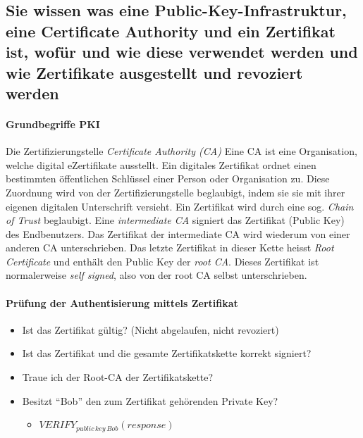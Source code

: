 \documentclass[10pt,a4paper]{article}
\begin{document}
\subsection*{Sie wissen was eine Public-Key-Infrastruktur, eine Certificate Authority und ein Zertifikat ist, wofür und wie diese verwendet werden und wie Zertifikate ausgestellt und revoziert werden}

\paragraph*{Grundbegriffe PKI}Die Zertifizierungstelle \textsl{Certificate Authority (CA)}\newline
Eine CA ist eine Organisation, welche digital eZertifikate ausstellt. Ein digitales Zertifikat ordnet einen bestimmten öffentlichen Schlüssel einer Person oder Organisation zu. Diese Zuordnung wird von der Zertifizierungstelle beglaubigt, indem sie sie mit ihrer eigenen digitalen Unterschrift versieht.\newline
Ein Zertifikat wird durch eine sog. \textsl{Chain of Trust} beglaubigt. Eine \textsl{intermediate CA} signiert das Zertifikat (Public Key) des Endbenutzers. Das Zertifikat der intermediate CA wird wiederum von einer anderen CA unterschrieben. Das letzte Zertifikat in dieser Kette heisst \textsl{Root Certificate} und enthält den Public Key der \textsl{root CA}. Dieses Zertifikat ist normalerweise \textsl{self signed}, also von der root CA selbst unterschrieben.

\paragraph*{Prüfung der Authentisierung mittels Zertifikat}
\begin{itemize}[noitemsep,topsep=0pt,leftmargin=*]
    \item Ist das Zertifikat gültig? (Nicht abgelaufen, nicht revoziert)
    \item Ist das Zertifikat und die gesamte Zertifikatskette korrekt signiert?
    \item Traue ich der Root-CA der Zertifikatskette?
    \item Besitzt "`Bob"' den zum Zertifikat gehörenden Private Key?
    \begin{itemize}[noitemsep,topsep=0pt,leftmargin=*]
        \item $VERIFY_{public\,key\,Bob}(response)$
    \end{itemize}
\end{itemize}
\end{document}
